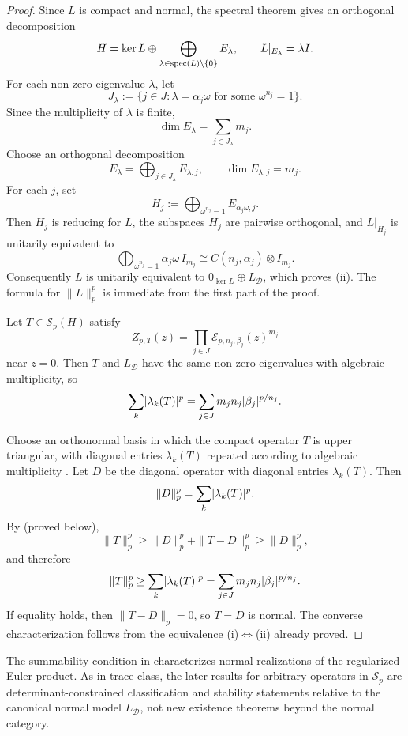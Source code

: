 \begin{proof}
  Since \(L\) is compact and normal, the spectral theorem gives an
  orthogonal decomposition
  \[
    H=\ker L\oplus\bigoplus_{\lambda\in\operatorname{spec}(L)\setminus\{0\}}E_\lambda,
    \qquad
    L|_{E_\lambda}=\lambda I.
  \]
  For each non-zero eigenvalue \(\lambda\), let
  \[
    J_\lambda
    :=\bigl\{j\in J:\lambda=\alpha_j\omega
      \text{ for some }\omega^{n_j}=1\bigr\}.
  \]
  Since the multiplicity of \(\lambda\) is finite,
  \[
    \dim E_\lambda=\sum_{j\in J_\lambda}m_j.
  \]
  Choose an orthogonal decomposition
  \[
    E_\lambda=\bigoplus_{j\in J_\lambda}E_{\lambda,j},
    \qquad
    \dim E_{\lambda,j}=m_j.
  \]
  For each \(j\), set
  \[
    H_j:=\bigoplus_{\omega^{n_j}=1}E_{\alpha_j\omega,j}.
  \]
  Then \(H_j\) is reducing for \(L\), the subspaces \(H_j\) are
  pairwise orthogonal, and \(L|_{H_j}\) is unitarily equivalent to
  \[
    \bigoplus_{\omega^{n_j}=1}\alpha_j\omega\,I_{m_j}
    \cong C(n_j,\alpha_j)\otimes I_{m_j}.
  \]
  Consequently \(L\) is unitarily equivalent to
  \(0_{\ker L}\oplus L_{\mathcal D}\), which proves \textup{(ii)}. The
  formula for \(\|L\|_p^p\) is immediate from the first part of the
  proof.

  Let \(T\in \mathcal S_p(H)\) satisfy
  \[
    Z_{p,T}(z)
    =\prod_{j\in J}\mathcal E_{p,n_j,\beta_j}(z)^{m_j}
  \]
  near \(z=0\). Then \(T\) and \(L_{\mathcal D}\) have the same
  non-zero eigenvalues with algebraic multiplicity, so
  \[
    \sum_k\lvert \lambda_k(T) \rvert^p
    =\sum_{j\in J}m_jn_j\lvert \beta_j \rvert^{p/n_j}.
  \]

  Choose an orthonormal basis in which the compact operator \(T\) is
  upper triangular, with diagonal entries \(\lambda_k(T)\) repeated
  according to algebraic multiplicity \cite{Ringrose1971}. Let \(D\) be
  the diagonal operator with diagonal entries \(\lambda_k(T)\). Then
  \[
    \|D\|_p^p=\sum_k\lvert \lambda_k(T) \rvert^p.
  \]
  By  \textup{(proved below)},
  \[
    \|T\|_p^p
    \ge \|D\|_p^p+\|T-D\|_p^p
    \ge \|D\|_p^p,
  \]
  and therefore
  \[
    \|T\|_p^p
    \ge \sum_k\lvert \lambda_k(T) \rvert^p
    =\sum_{j\in J}m_jn_j\lvert \beta_j \rvert^{p/n_j}.
  \]
  If equality holds, then \(\|T-D\|_p=0\), so \(T=D\) is normal. The
  converse characterization follows from the equivalence
  \textup{(i)}\(\Leftrightarrow\)\textup{(ii)} already proved.
\end{proof}

\begin{remark}
  \label{rem:normal-scope-schatten}
  The summability condition in 
  characterizes normal realizations of the regularized Euler product.
  As in trace class, the later results for arbitrary operators in
  \(\mathcal S_p\) are determinant-constrained classification and
  stability statements relative to the canonical normal model
  \(L_{\mathcal D}\), not new existence theorems beyond the normal
  category.
\end{remark}

